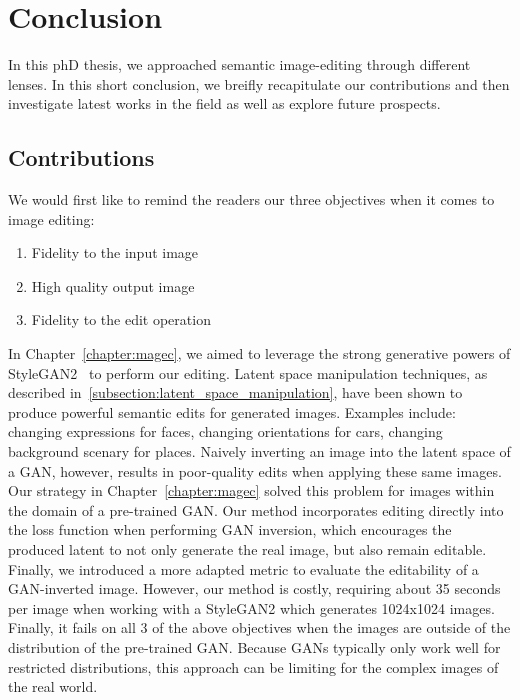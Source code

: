 \chapter{Conclusion}
\label{chapter:conclusion}

{}



In this phD thesis, we approached semantic image-editing through different lenses. 
In this short conclusion, we breifly recapitulate our contributions and then 
investigate latest works in the field as well as explore future prospects. 


\section{Contributions}

We would first like to remind the readers our three objectives when it comes to image editing:

\begin{enumerate}
    \item Fidelity to the input image
    \item High quality output image 
    \item Fidelity to the edit operation 
\end{enumerate}

In Chapter~\ref{chapter:magec}, we aimed to leverage the strong generative powers of StyleGAN2~\citep{karra2020stylegan2}
to perform our editing. Latent space manipulation techniques, as described in~\ref{subsection:latent_space_manipulation}, have 
been shown to produce powerful semantic edits for generated images. Examples include: changing expressions for faces, changing 
orientations for cars, changing background scenary for places. Naively inverting an image into the latent space of a \ac{GAN},
however, results in poor-quality edits when applying these same images. Our \magec strategy in Chapter~\ref{chapter:magec} solved this problem 
for images within the domain of a pre-trained \ac{GAN}. Our method incorporates editing directly into the loss function when performing 
\ac{GAN} inversion, which encourages the produced latent to not only generate the real image, but also remain editable. Finally, we introduced 
a more adapted metric to evaluate the editability of a \ac{GAN}-inverted image. 
However, our method is costly, requiring about 35 seconds per image when working with a StyleGAN2 
which generates 1024x1024 images. Finally, it fails on all 3 of the above objectives when the images are outside of the 
distribution of the pre-trained \ac{GAN}. 
Because \ac{GAN}s typically only work well for restricted distributions, this approach can be limiting for the complex images of the real world.

